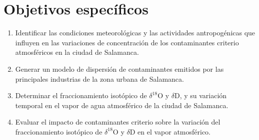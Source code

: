 \section{Objetivos específicos}
\begin{enumerate}
    
    \item Identificar las condiciones meteorológicas y las actividades
    antropogénicas que influyen en las variaciones de concentración de
    los contaminantes criterio atmosféricos en la ciudad de Salamanca.

    \item Generar un modelo de dispersión de contaminantes emitidos por
    las principales industrias de la zona urbana de Salamanca.

    \item Determinar el fraccionamiento isotópico de $\delta^{18}$O y
    $\delta$D, y su variación temporal en el vapor de agua
    atmosférico de la ciudad de Salamanca.

    \item Evaluar el impacto de contaminantes criterio sobre la variación
    del fraccionamiento isotópico de $\delta^{18}$O y $\delta$D en
    el vapor atmosférico.

\end{enumerate}